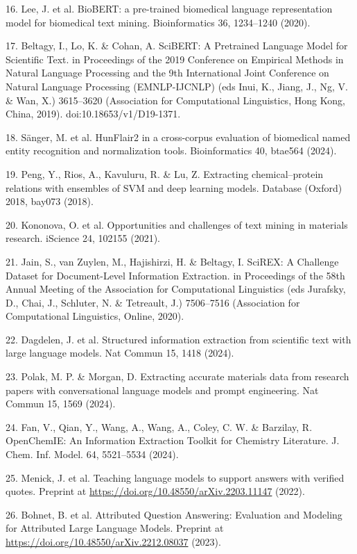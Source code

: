 \documentclass[
]{article}
\begin{document}
16. Lee, J. et al. BioBERT: a pre-trained biomedical language representation model for biomedical text mining. Bioinformatics 36, 1234--1240 (2020).

17. Beltagy, I., Lo, K. \& Cohan, A. SciBERT: A Pretrained Language Model for Scientific Text. in Proceedings of the 2019 Conference on Empirical Methods in Natural Language Processing and the 9th International Joint Conference on Natural Language Processing (EMNLP-IJCNLP) (eds Inui, K., Jiang, J., Ng, V. \& Wan, X.) 3615--3620 (Association for Computational Linguistics, Hong Kong, China, 2019). doi:10.18653/v1/D19-1371.

18. Sänger, M. et al. HunFlair2 in a cross-corpus evaluation of biomedical named entity recognition and normalization tools. Bioinformatics 40, btae564 (2024).

19. Peng, Y., Rios, A., Kavuluru, R. \& Lu, Z. Extracting chemical--protein relations with ensembles of SVM and deep learning models. Database (Oxford) 2018, bay073 (2018).

20. Kononova, O. et al. Opportunities and challenges of text mining in materials research. iScience 24, 102155 (2021).

21. Jain, S., van Zuylen, M., Hajishirzi, H. \& Beltagy, I. SciREX: A Challenge Dataset for Document-Level Information Extraction. in Proceedings of the 58th Annual Meeting of the Association for Computational Linguistics (eds Jurafsky, D., Chai, J., Schluter, N. \& Tetreault, J.) 7506--7516 (Association for Computational Linguistics, Online, 2020).

22. Dagdelen, J. et al. Structured information extraction from scientific text with large language models. Nat Commun 15, 1418 (2024).

23. Polak, M. P. \& Morgan, D. Extracting accurate materials data from research papers with conversational language models and prompt engineering. Nat Commun 15, 1569 (2024).

24. Fan, V., Qian, Y., Wang, A., Wang, A., Coley, C. W. \& Barzilay, R. OpenChemIE: An Information Extraction Toolkit for Chemistry Literature. J. Chem. Inf. Model. 64, 5521--5534 (2024).

25. Menick, J. et al. Teaching language models to support answers with verified quotes. Preprint at \url{https://doi.org/10.48550/arXiv.2203.11147} (2022).

26. Bohnet, B. et al. Attributed Question Answering: Evaluation and Modeling for Attributed Large Language Models. Preprint at \url{https://doi.org/10.48550/arXiv.2212.08037} (2023).
\end{document}
